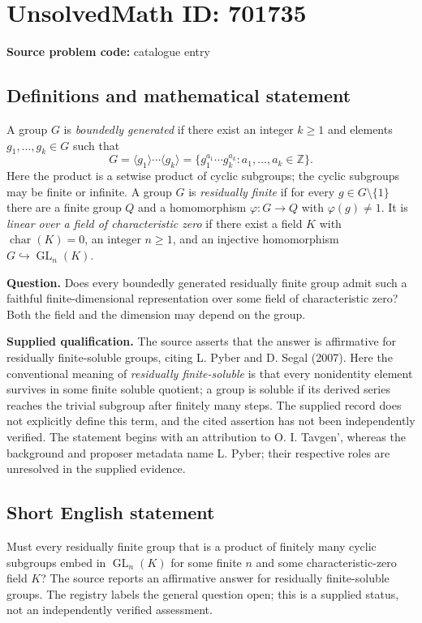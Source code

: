 \documentclass[11pt]{article}
\newcommand{\Z}{\mathbb{Z}}
\begin{document}
\section*{UnsolvedMath ID: 701735}
\textbf{Source problem code:} catalogue entry
\subsection{Definitions and mathematical statement}
A group \(G\) is \emph{boundedly generated} if there exist an integer \(k\geq 1\) and elements \(g_1,\ldots,g_k\in G\) such that
\[
G=\langle g_1\rangle\cdots\langle g_k\rangle
=\{g_1^{a_1}\cdots g_k^{a_k}:a_1,\ldots,a_k\in\Z\}.
\]
Here the product is a setwise product of cyclic subgroups; the cyclic subgroups may be finite or infinite. A group \(G\) is \emph{residually finite} if for every \(g\in G\setminus\{1\}\) there are a finite group \(Q\) and a homomorphism \(\varphi:G\to Q\) with \(\varphi(g)\neq 1\). It is \emph{linear over a field of characteristic zero} if there exist a field \(K\) with \(\operatorname{char}(K)=0\), an integer \(n\geq 1\), and an injective homomorphism \(G\hookrightarrow\operatorname{GL}_n(K)\).

\textbf{Question.} Does every boundedly generated residually finite group admit such a faithful finite-dimensional representation over some field of characteristic zero? Both the field and the dimension may depend on the group.

\textbf{Supplied qualification.} The source asserts that the answer is affirmative for residually finite-soluble groups, citing L. Pyber and D. Segal (2007). Here the conventional meaning of \emph{residually finite-soluble} is that every nonidentity element survives in some finite soluble quotient; a group is soluble if its derived series reaches the trivial subgroup after finitely many steps. The supplied record does not explicitly define this term, and the cited assertion has not been independently verified. The statement begins with an attribution to O. I. Tavgen', whereas the background and proposer metadata name L. Pyber; their respective roles are unresolved in the supplied evidence.
\subsection{Short English statement}
Must every residually finite group that is a product of finitely many cyclic subgroups embed in \(\operatorname{GL}_n(K)\) for some finite \(n\) and some characteristic-zero field \(K\)? The source reports an affirmative answer for residually finite-soluble groups. The registry labels the general question open; this is a supplied status, not an independently verified assessment.
\end{document}
